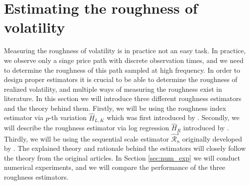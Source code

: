 \documentclass{article}
\begin{document}
\section{Estimating the roughness of volatility}
Measuring the roughness of volatility is in practice not an easy task. 
In practice, we observe only a singe price path with discrete observation times, and we need to determine the roughness of this path sampled at high frequency. In order to design proper estimators it is crucial to be able to determine the roughness of realized volatility, and multiple ways of measuring the roughness exist in literature. In this section we will introduce three different roughness estimators and the theory behind them. Firstly, we will be using the roughness index estimator via $p$-th variation $\widehat{H}_{L,K}$ which was first introduced by \cite{cont}. Secondly, we will describe the roughness estimator via log regression $\widehat{H}_{R}$ introduced by \cite{gatheral}. Thirdly, we will be using the sequential scale estimator $\widehat{\mathscr{R}}_n^s$ originally developed by \cite{han}. The explained theory and rationale behind the estimators will closely follow the theory from the original articles. In Section \ref{sec:num_exp} we will conduct numerical experiments, and we will compare the performance of the three roughness estimators. 
\end{document}
